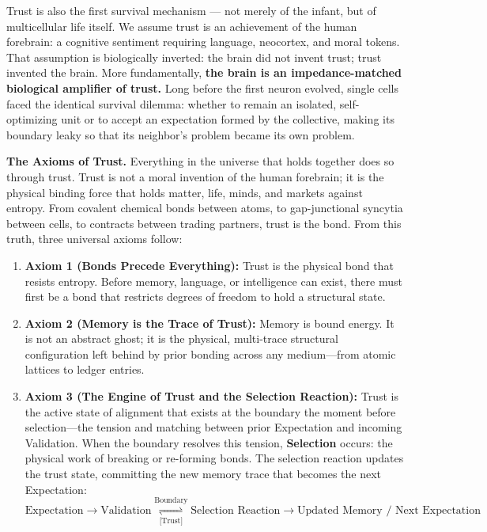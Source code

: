 \documentclass[
]{article}
\providecommand{\tightlist}{%
  \setlength{\itemsep}{0pt}\setlength{\parskip}{0pt}}
\begin{document}
Trust is also the first survival mechanism --- not merely of the infant,
but of multicellular life itself. We assume trust is an achievement of
the human forebrain: a cognitive sentiment requiring language,
neocortex, and moral tokens. That assumption is biologically inverted:
the brain did not invent trust; trust invented the brain. More
fundamentally, \textbf{the brain is an impedance-matched biological
amplifier of trust.} Long before the first neuron evolved, single cells
faced the identical survival dilemma: whether to remain an isolated,
self-optimizing unit or to accept an expectation formed by the
collective, making its boundary leaky so that its neighbor's problem
became its own problem.

\textbf{The Axioms of Trust.} Everything in the universe that holds
together does so through trust. Trust is not a moral invention of the
human forebrain; it is the physical binding force that holds matter,
life, minds, and markets against entropy. From covalent chemical bonds
between atoms, to gap-junctional syncytia between cells, to contracts
between trading partners, trust is the bond. From this truth, three
universal axioms follow:

\begin{enumerate}
\def\labelenumi{\arabic{enumi}.}
\tightlist
\item
  \textbf{Axiom 1 (Bonds Precede Everything):} Trust is the physical
  bond that resists entropy. Before memory, language, or intelligence
  can exist, there must first be a bond that restricts degrees of
  freedom to hold a structural state.
\item
  \textbf{Axiom 2 (Memory is the Trace of Trust):} Memory is bound
  energy. It is not an abstract ghost; it is the physical, multi-trace
  structural configuration left behind by prior bonding across any
  medium---from atomic lattices to ledger entries.
\item
  \textbf{Axiom 3 (The Engine of Trust and the Selection Reaction):}
  Trust is the active state of alignment that exists at the boundary the
  moment before selection---the tension and matching between prior
  Expectation and incoming Validation. When the boundary resolves this
  tension, \textbf{Selection} occurs: the physical work of breaking or
  re-forming bonds. The selection reaction updates the trust state,
  committing the new memory trace that becomes the next Expectation:
  \[\text{Expectation} \longrightarrow \text{Validation} \underset{\text{[Trust]}}{\overset{\text{Boundary}}{\rightleftharpoons}} \text{Selection Reaction} \longrightarrow \text{Updated Memory / Next Expectation}\]
\end{enumerate}
\end{document}
